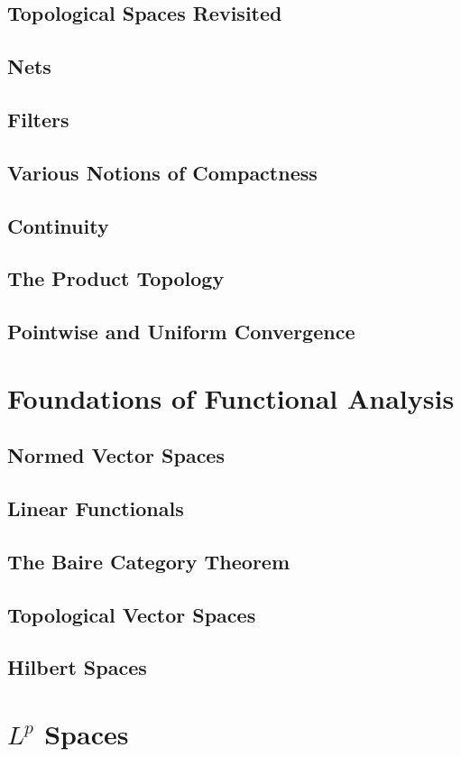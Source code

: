 \documentclass{article}
\theoremstyle{definition}
\begin{document}
\subsection{Topological Spaces Revisited}
\subsection{Nets}
\subsection{Filters}
\subsection{Various Notions of Compactness}
\subsection{Continuity}
\subsection{The Product Topology}
\subsection{Pointwise and Uniform Convergence}
\section{Foundations of Functional Analysis}
\subsection{Normed Vector Spaces}
\subsection{Linear Functionals}
\subsection{The Baire Category Theorem}
\subsection{Topological Vector Spaces}
\subsection{Hilbert Spaces}
\section{$ L^p $ Spaces}
\end{document}
